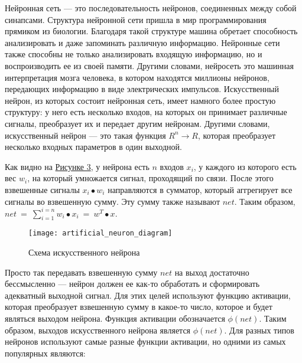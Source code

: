     Нейронная сеть — это последовательность нейронов, соединенных между собой синапсами. Структура нейронной сети пришла в мир программирования прямиком из биологии. Благодаря такой структуре машина обретает способность анализировать и даже запоминать различную информацию. Нейронные сети также способны не только анализировать входящую информацию, но и воспроизводить ее из своей памяти. Другими словами, нейросеть это машинная интерпретация мозга человека, в котором находятся миллионы нейронов, передающих информацию в виде электрических импульсов. Искусственный нейрон, из которых состоит нейронная сеть, имеет намного более простую структуру: у него есть несколько входов, на которых он принимает различные сигналы, преобразует их и передает другим нейронам. Другими словами, искусственный нейрон — это такая функция $R^n\rightarrow R$, которая преобразует несколько входных параметров в один выходной.

    Как видно на \hyperref[fig:artificial_neuron_diagram]{Рисунке 3}, у нейрона есть $n$ входов $x_i$, у каждого из которого есть вес $w_i$, на который умножается сигнал, проходящий по связи. После этого взвешенные сигналы $x_i\bullet w_i$ направляются в сумматор, который аггрегирует все сигналы во взвешенную сумму. Эту сумму также называют $net$. Таким образом, $net\ =\ \sum_{i=1}^{i=n}w_i\bullet x_i\ =\ w^T\bullet x$.

     \begin{figure}[ht]
        \centering
        \texttt{[image: artificial\_neuron\_diagram]}
        \caption{Схема искусственного нейрона}
        \label{fig:artificial_neuron_diagram}
    \end{figure}

    Просто так передавать взвешенную сумму $net$ на выход достаточно бессмысленно — нейрон должен ее как-то обработать и сформировать адекватный выходной сигнал. Для этих целей используют функцию активации, которая преобразует взвешенную сумму в какое-то число, которое и будет являться выходом нейрона. Функция активации обозначается $\phi(net)$. Таким образом, выходов искусственного нейрона является $\phi(net)$. Для разных типов нейронов используют самые разные функции активации, но одними из самых популярных являются:

